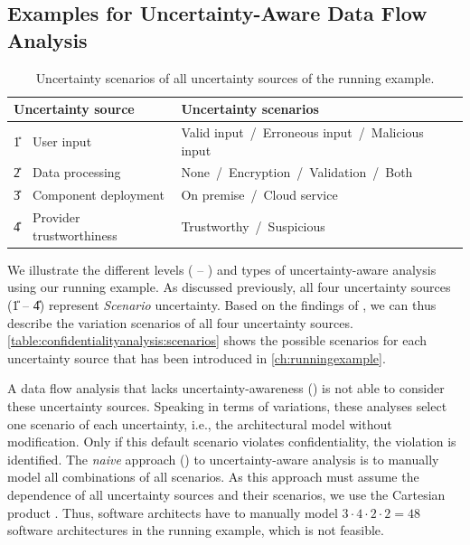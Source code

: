 

\subsection{Examples for Uncertainty-Aware Data Flow Analysis}

\begin{table}
    \begin{tabularx}{\linewidth}{llX}
        \toprule
        \multicolumn{2}{l}{Uncertainty source} & Uncertainty scenarios \\
        \midrule
        \U{1} & User input & Valid input \,/\, Erroneous input \,/\, Malicious input \\
        \U{2} & Data processing & None \,/\, Encryption \,/\, Validation \,/\, Both \\
        \U{3} & Component deployment & On premise \,/\, Cloud service \\
        \U{4} & Provider trustworthiness & Trustworthy \,/\, Suspicious \\
        \bottomrule
    \end{tabularx}
    \caption{Uncertainty scenarios of all uncertainty sources of the running example.}%
    \label{table:confidentialityanalysis:scenarios}
\end{table}

We illustrate the different levels ( -- ) and types of uncertainty-aware analysis using our running example.
As discussed previously, all four uncertainty sources (\U{1} -- \U{4}) represent \emph{Scenario} uncertainty.
Based on the findings of \textcite{troya_uncertainty_2021}, we can thus describe the variation scenarios of all four uncertainty sources.
\autoref{table:confidentialityanalysis:scenarios} shows the possible scenarios for each uncertainty source that has been introduced in \autoref{ch:runningexample}.

A data flow analysis that lacks uncertainty-awareness () is not able to consider these uncertainty sources.
Speaking in terms of variations, these analyses select one scenario of each uncertainty, i.e., the architectural model without modification.
Only if this default scenario violates confidentiality, the violation is identified.
The \emph{naive} approach () to uncertainty-aware analysis is to manually model all combinations of all scenarios.
As this approach must assume the dependence of all uncertainty sources and their scenarios, we use the Cartesian product \cite{de_finetti_theory_2017}.
Thus, software architects have to manually model $3 \cdot 4 \cdot 2 \cdot 2 = 48$ software architectures in the running example, which is not feasible.

